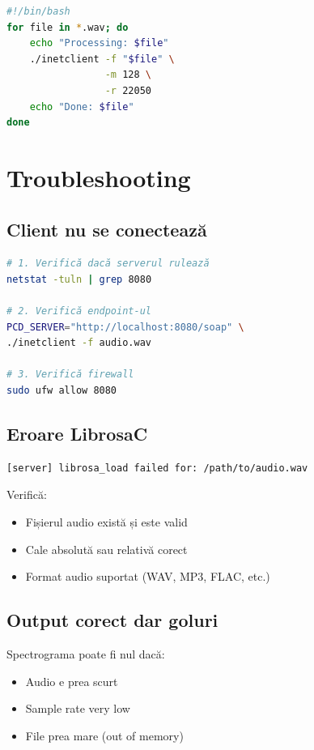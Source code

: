 \documentclass[12pt,a4paper,oneside]{book}
\begin{document}
\begin{lstlisting}[language=bash]
#!/bin/bash
for file in *.wav; do
    echo "Processing: $file"
    ./inetclient -f "$file" \
                 -m 128 \
                 -r 22050
    echo "Done: $file"
done
\end{lstlisting}

\section{Troubleshooting}

\subsection{Client nu se conectează}

\begin{lstlisting}[language=bash]
# 1. Verifică dacă serverul rulează
netstat -tuln | grep 8080

# 2. Verifică endpoint-ul
PCD_SERVER="http://localhost:8080/soap" \
./inetclient -f audio.wav

# 3. Verifică firewall
sudo ufw allow 8080
\end{lstlisting}

\subsection{Eroare LibrosaC}

\begin{lstlisting}
[server] librosa_load failed for: /path/to/audio.wav
\end{lstlisting}

Verifică:
\begin{itemize}
    \item Fișierul audio există și este valid
    \item Cale absolută sau relativă corect
    \item Format audio suportat (WAV, MP3, FLAC, etc.)
\end{itemize}

\subsection{Output corect dar goluri}

Spectrograma poate fi nul dacă:
\begin{itemize}
    \item Audio e prea scurt
    \item Sample rate very low
    \item File prea mare (out of memory)
\end{itemize}
\end{document}
